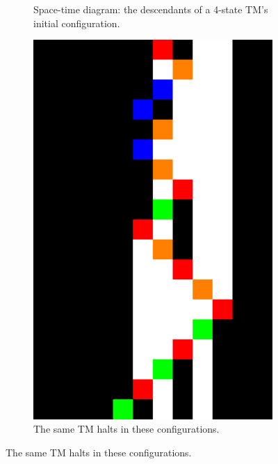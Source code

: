\begin{figure}
\begin{subfigure}[m]{0.125\textwidth}
    \caption{Space-time diagram: the descendants of a 4-state TM's initial configuration.}
    \label{fig:far_spacetime}
  \end{subfigure}
  \hfill
  \parbox{0.2\textwidth}{
    \begin{subfigure}[t]{0.2\textwidth}
      \centering
      \includegraphics[width=\textwidth]{space-time-diagrams/finite-automata-reduction-counter4-halt.pdf}
      \caption{The same TM halts in these configurations.}
      \label{fig:far_spacetime_halt}
    \end{subfigure}
    \vspace{0.23\textheight}

}
\end{figure}

